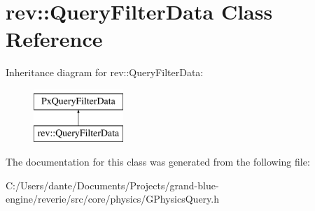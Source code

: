 \hypertarget{classrev_1_1_query_filter_data}{}\section{rev\+::Query\+Filter\+Data Class Reference}
\label{classrev_1_1_query_filter_data}
Inheritance diagram for rev\+::Query\+Filter\+Data\+:\begin{figure}[H]
\begin{center}
\leavevmode
\includegraphics[height=2.000000cm]{classrev_1_1_query_filter_data}
\end{center}
\end{figure}


The documentation for this class was generated from the following file\+:\begin{DoxyCompactItemize}
\item 
C\+:/\+Users/dante/\+Documents/\+Projects/grand-\/blue-\/engine/reverie/src/core/physics/G\+Physics\+Query.\+h\end{DoxyCompactItemize}
